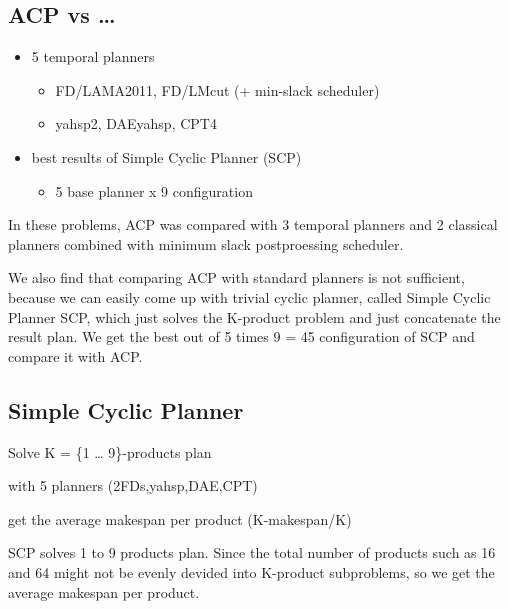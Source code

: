 \subsection{ACP vs \ldots{}}
\label{sec-9-1}

\begin{itemize}
\item 5 temporal planners
\begin{itemize}
\item FD/LAMA2011, FD/LMcut (+ min-slack scheduler)
\item yahsp2, DAEyahsp, CPT4
\end{itemize}
\item best results of Simple Cyclic Planner (SCP)
\begin{itemize}
\item 5 base planner x 9 configuration
\end{itemize}
\end{itemize}

\begin{resume}
In these problems, ACP was compared with 3 temporal planners and 2
classical planners combined with minimum slack postproessing scheduler.

We also find that comparing ACP with standard planners is not sufficient, because
we can easily come up with trivial cyclic planner, called Simple Cyclic Planner
SCP, which just solves the K-product problem and just concatenate the result plan.
We get the best out of 5 times 9 = 45 configuration of SCP and compare it with ACP.
\end{resume}

\subsection{Simple Cyclic Planner}
\label{sec-9-2}

Solve K = \{1 \ldots{} 9\}-products plan

with 5 planners (2FDs,yahsp,DAE,CPT)

get the average makespan per product (K-makespan/K)

\begin{resume}
SCP solves 1 to 9 products plan. Since the total number of products such as
16 and 64 might not be evenly devided into K-product subproblems,
so we get the average makespan per product.
\end{resume}

